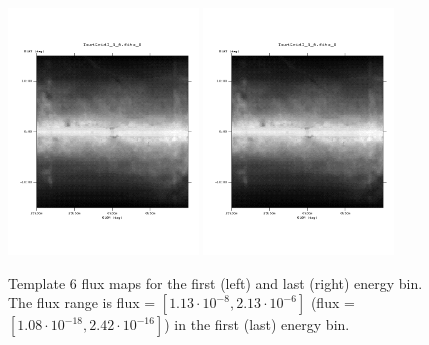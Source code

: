 \documentclass{article}
\begin{document}
\begin{figure}
\centering
\includegraphics[trim = 50 100 70 100, clip = true, width=0.45\textwidth]{figs/Template_maps/Template6_Ebin01}
\includegraphics[trim = 50 100 70 100, clip = true, width=0.45\textwidth]{figs/Template_maps/Template6_Ebin71}
\caption{Template 6 flux maps for the first (left) and last (right) energy bin. The flux range is flux = $[1.13 \cdot 10^{-8}, 2.13 \cdot 10^{-6}]$ (flux = $[1.08 \cdot 10^{-18}, 2.42 \cdot 10^{-16}]$) in the first (last) energy bin.}
\end{figure}
\end{document}

